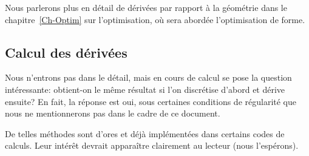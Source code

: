 \medskip
Nous parlerons plus en détail de dérivées par rapport à la géométrie dans le chapitre~\ref{Ch-Optim} sur l'optimisation, où sera abordée l'optimisation de forme.

\medskip
\subsection{Calcul des dérivées}

Nous n'entrons pas dans le détail, mais en cours de calcul se pose la question intéressante: obtient-on le même résultat si l'on discrétise d'abord et dérive ensuite? En fait, la réponse est oui, sous certaines conditions de régularité que nous ne mentionnerons pas dans le cadre de ce document.

\medskip
{}

De telles méthodes sont d'ores et déjà implémentées dans certains codes de calculs. Leur intérêt devrait apparaître clairement au lecteur (nous l'espérons).
